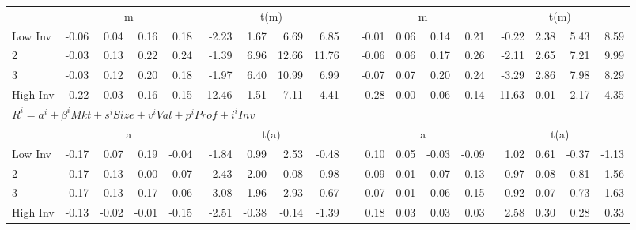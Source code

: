 \begin{table}[!ht]
\begin{tabular}{lrrrrrrrrlrrrrrrrr}
  
    
      & \multicolumn{4}{c}{m} & \multicolumn{4}{c}{t(m)}
      &
      & \multicolumn{4}{c}{m} & \multicolumn{4}{c}{t(m)}
    
    \\
      \cmidrule(r){2-5} \cmidrule(r){6-9} \cmidrule(r){11-14} \cmidrule(r){15-18}

    Low Inv   & -0.06  & 0.04  & 0.16  & 0.18  & -2.23  & 1.67  & 6.69  & 6.85 & & -0.01  & 0.06  & 0.14  & 0.21  & -0.22  & 2.38  & 5.43  & 8.59  \\
           2  & -0.03  & 0.13  & 0.22  & 0.24  & -1.39  & 6.96  & 12.66  & 11.76 & & -0.06  & 0.06  & 0.17  & 0.26  & -2.11  & 2.65  & 7.21  & 9.99  \\
           3  & -0.03  & 0.12  & 0.20  & 0.18  & -1.97  & 6.40  & 10.99  & 6.99 & & -0.07  & 0.07  & 0.20  & 0.24  & -3.29  & 2.86  & 7.98  & 8.29  \\
    High Inv  & -0.22  & 0.03  & 0.16  & 0.15  & -12.46  & 1.51  & 7.11  & 4.41 & & -0.28  & 0.00  & 0.06  & 0.14  & -11.63  & 0.01  & 2.17  & 4.35  \\

  \midrule
  \multicolumn{17}{l}{$R^i=a^i+\beta^iMkt+s^iSize+v^iVal+p^iProf+i^iInv$} \\

  
    
      & \multicolumn{4}{c}{a} & \multicolumn{4}{c}{t(a)}
      &
      & \multicolumn{4}{c}{a} & \multicolumn{4}{c}{t(a)}
    
    \\
      \cmidrule(r){2-5} \cmidrule(r){6-9} \cmidrule(r){11-14} \cmidrule(r){15-18}

    Low Inv   & -0.17  & 0.07  & 0.19  & -0.04  & -1.84  & 0.99  & 2.53  & -0.48 & & 0.10  & 0.05  & -0.03  & -0.09  & 1.02  & 0.61  & -0.37  & -1.13  \\
           2  & 0.17  & 0.13  & -0.00  & 0.07  & 2.43  & 2.00  & -0.08  & 0.98 & & 0.09  & 0.01  & 0.07  & -0.13  & 0.97  & 0.08  & 0.81  & -1.56  \\
           3  & 0.17  & 0.13  & 0.17  & -0.06  & 3.08  & 1.96  & 2.93  & -0.67 & & 0.07  & 0.01  & 0.06  & 0.15  & 0.92  & 0.07  & 0.73  & 1.63  \\
    High Inv  & -0.13  & -0.02  & -0.01  & -0.15  & -2.51  & -0.38  & -0.14  & -1.39 & & 0.18  & 0.03  & 0.03  & 0.03  & 2.58  & 0.30  & 0.28  & 0.33  \\

  
    

\end{tabular}
\end{table}
